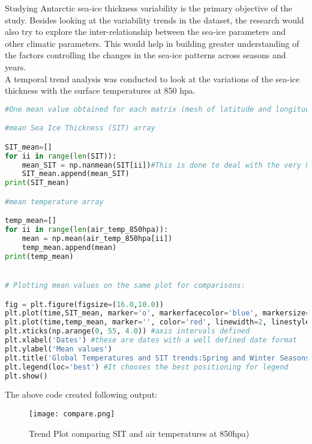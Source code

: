 \documentclass{article} %
\begin{document}
Studying Antarctic sea-ice thickness variability is the primary objective of the study. Besides looking at the variability trends in the dataset, the research would also try to explore the inter-relationship between the sea-ice parameters and other climatic parameters. This would help in building greater understanding of the factors controlling the changes in the sea-ice patterns across seasons and years. \\

A temporal trend analysis was conducted to look at the variations of the sea-ice thickness with the surface temperatures at 850 hpa. 


\begin{lstlisting}[language=Python, caption= Comparing two gridded variables]
#One mean value obtained for each matrix (mesh of latitude and longitude) for every timestep in the gridded data. 

#mean Sea Ice Thickness (SIT) array

SIT_mean=[]
for ii in range(len(SIT)):
    mean_SIT = np.nanmean(SIT[ii])#This is done to deal with the very high NaN values in the SIT dataset. 
    SIT_mean.append(mean_SIT)
print(SIT_mean)

#mean temperature array

temp_mean=[]
for ii in range(len(air_temp_850hpa)):
    mean = np.mean(air_temp_850hpa[ii])
    temp_mean.append(mean)
print(temp_mean)


# Plotting mean values on the same plot for comparisons: 

fig = plt.figure(figsize=(16.0,10.0))
plt.plot(time,SIT_mean, marker='o', markerfacecolor='blue', markersize=10, color='skyblue', linewidth=4,label='SIT')
plt.plot(time,temp_mean, marker='', color='red', linewidth=2, linestyle='dashed', label="Temperatures")
plt.xticks(np.arange(0, 55, 4.0)) #axis intervals defined
plt.xlabel('Dates') #these are dates with a well defined date format
plt.ylabel('Mean values')
plt.title('Global Temperatures and SIT trends:Spring and Winter Seasons (2002-11)')
plt.legend(loc='best') #It chooses the best positioning for legend 
plt.show()

\end{lstlisting}


The above code created following output: 

\begin{figure}[h]
    \centering
    \texttt{[image: compare.png]}%
    \caption{Trend Plot comparing SIT and air temperatures at 850hpa)}
    \label{fig:compare} %
\end{figure}
\end{document}

